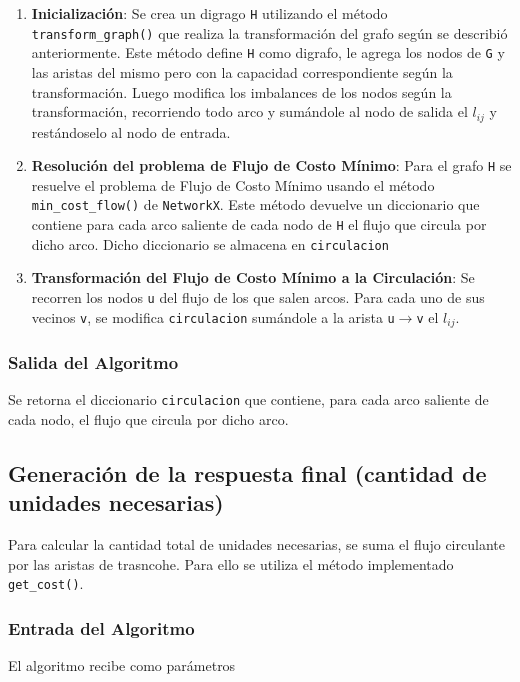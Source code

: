 \documentclass{article}
\begin{document}
\begin{enumerate}
    \item \textbf{Inicialización}: 
    Se crea un digrago \texttt{H} utilizando el método \texttt{transform\_graph()} que realiza la transformación del grafo según se describió anteriormente. Este método define \texttt{H} como digrafo, le agrega los nodos de \texttt{G} y las aristas del mismo pero con la capacidad correspondiente según la transformación. Luego modifica los imbalances de los nodos según la transformación, recorriendo todo arco y sumándole al nodo de salida el $l_{ij}$ y restándoselo al nodo de entrada. 

    \item \textbf{Resolución del problema de Flujo de Costo Mínimo}:
    Para el grafo \texttt{H} se resuelve el problema de Flujo de Costo Mínimo usando el método \texttt{min\_cost\_flow()} de \texttt{NetworkX}. Este método devuelve un diccionario que contiene para cada arco saliente de cada nodo de \texttt{H} el flujo que circula por dicho arco. Dicho diccionario se almacena en \texttt{circulacion}

    \item \textbf{Transformación del Flujo de Costo Mínimo a la Circulación}:
    Se recorren los nodos \texttt{u} del flujo de los que salen arcos. Para cada uno de sus vecinos \texttt{v}, se modifica \texttt{circulacion} sumándole a la arista \texttt{u$\rightarrow$v} el $l_{ij}$.

\end{enumerate}

\subsubsection*{Salida del Algoritmo}
Se retorna el diccionario \texttt{circulacion} que contiene, para cada arco saliente de cada nodo, el flujo que circula por dicho arco.

\subsection*{Generación de la respuesta final (cantidad de unidades necesarias)}
Para calcular la cantidad total de unidades necesarias, se suma el flujo circulante por las aristas de trasncohe. Para ello se utiliza el método implementado \texttt{get\_cost()}.

\subsubsection*{Entrada del Algoritmo}
El algoritmo recibe como parámetros
\end{document}
